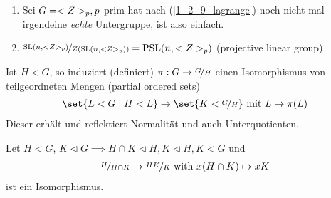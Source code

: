 \begin{example}
	\begin{enumerate}
		\item Sei $G = <Z>_p, p$ prim hat nach  (\cref{1_2_9_lagrange}) noch nicht mal irgendeine \emph{echte} Untergruppe, ist also einfach.
		\item $\lnkset{\SL(n, \Z_p)}{Z(\SL(n, \Z_p))} = \PSL(n, \Z_p)$ (projective linear group)
	\end{enumerate}
\end{example}
\begin{proposition}[Korrespondenztheorem]
	Ist $H \lhd G$, so induziert (definiert) $\pi: G \to \lnkset{G}{H}$ einen Isomorphismus von teilgeordneten Mengen (partial ordered sets)
	\begin{align*}
		\set{L < G \mid H < L} \to \set{K < \lnkset{G}{H}} \mit L \mapsto \pi(L)
	\end{align*}
	Dieser erhält und reflektiert Normalität und auch Unterquotienten. 
\end{proposition}
\begin{proposition}
	Let $H < G$, $K \lhd G \implies H\cap K \lhd H, K\lhd H,K < G$ und 
	\begin{align*}
		\lnkset{H}{H \cap K} \to \lnkset{HK}{K} \with x(H\cap K) \mapsto xK
	\end{align*}
	ist ein Isomorphismus.
\end{proposition}

